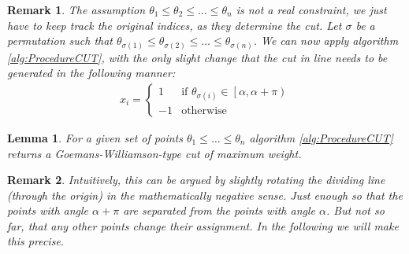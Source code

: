 \documentclass[12pt,a4paper]{article}
\theoremstyle{mythm}
\newtheorem{lem}[thm]{Lemma}
\newtheorem*{rem}{Remark}
\begin{document}
\begin{rem}
The assumption $ \theta_1 \leq \theta_2 \leq \dots \leq \theta_n  $ is not a real constraint, we just have to keep track the original indices, as they determine the cut.
Let $ \sigma $ be a permutation such that $ \theta _{ \sigma (1) } \leq \theta _{ \sigma (2) } \leq \dots \leq \theta _{ \sigma (n) }  $. 
We can now apply algorithm \ref{alg:ProcedureCUT}, with the only slight change that the cut in line  needs to be generated in the following manner:
\begin{align*}
x_i = \begin{cases}
1 & \text{if } \theta _{ \sigma (i) } \in \left[ \alpha, \alpha + \pi  \right)  \\
-1 & \text{otherwise} 
\end{cases}
\end{align*} 
\end{rem} 
\begin{lem}
\label{lem:algGeneratesAllgwtc} 
For a given set of points $ \theta_1 \leq \dots \leq \theta_n   $ algorithm \ref{alg:ProcedureCUT} returns a Goemans-Williamson-type cut of maximum weight.
\end{lem} 
\begin{rem}
Intuitively, this can be argued by slightly rotating the dividing line (through the origin) in the mathematically negative sense. 
Just enough so that the points with angle $ \alpha + \pi  $ are separated from the points with angle $ \alpha $.
But not so far, that any other points change their assignment.
In the following we will make this precise.
\end{rem} 
\end{document}
